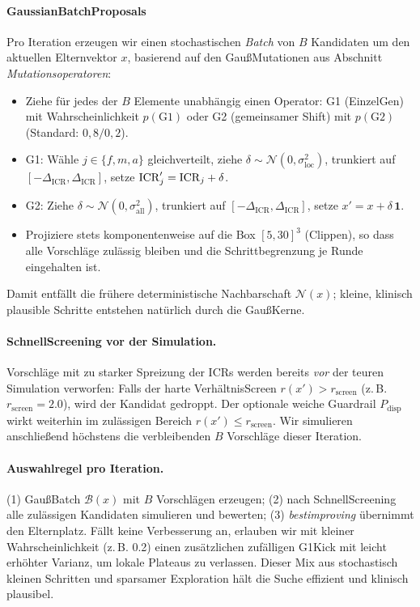 \paragraph{Gaussian\-Batch\-Proposals}
Pro Iteration erzeugen wir einen stochastischen \emph{Batch} von $B$ Kandidaten um den aktuellen Elternvektor $x$, basierend auf den Gau{\ss}\-Mutationen aus Abschnitt \emph{Mutationsoperatoren}:
\begin{itemize}
  \item Ziehe f\"ur jedes der $B$ Elemente unabh\"angig einen Operator: G1 (Einzel\-Gen) mit Wahrscheinlichkeit $p(\mathrm{G1})$ oder G2 (gemeinsamer Shift) mit $p(\mathrm{G2})$ (Standard: $0{,}8/0{,}2$).
  \item G1: W\"ahle $j\in\{f,m,a\}$ gleichverteilt, ziehe $\delta\sim\mathcal N(0,\sigma_{\text{loc}}^2)$, trunkiert auf $[-\Delta_{\mathrm{ICR}},\Delta_{\mathrm{ICR}}]$, setze $\mathrm{ICR}'_j=\mathrm{ICR}_j+\delta$.
  \item G2: Ziehe $\delta\sim\mathcal N(0,\sigma_{\text{all}}^2)$, trunkiert auf $[-\Delta_{\mathrm{ICR}},\Delta_{\mathrm{ICR}}]$, setze $x'=x+\delta\,\mathbf 1$.
  \item Projiziere stets komponentenweise auf die Box $[5,30]^3$ (Clippen), so dass alle Vorschl\"age zul\"assig bleiben und die Schrittbegrenzung je Runde eingehalten ist.
\end{itemize}
Damit entf\"allt die fr\"uhere deterministische Nachbarschaft $\mathcal N(x)$; kleine, klinisch plausible Schritte entstehen nat\"urlich durch die Gau{\ss}\-Kerne.

\paragraph{Schnell\-Screening vor der Simulation.}
Vorschl\"age mit zu starker Spreizung der ICRs werden bereits \emph{vor} der teuren Simulation verworfen: Falls der harte Verh\"altnis\-Screen $r(x')>r_{\text{screen}}$ (z.\,B. $r_{\text{screen}}=2.0$), wird der Kandidat gedroppt. Der optionale weiche Guardrail $P_{\mathrm{disp}}$ wirkt weiterhin im zul\"assigen Bereich $r(x')\le r_{\text{screen}}$. Wir simulieren anschlie\ss end h\"ochstens die verbleibenden $B$ Vorschl\"age dieser Iteration.

\paragraph{Auswahlregel pro Iteration.}
(1) Gau{\ss}\-Batch $\mathcal B(x)$ mit $B$ Vorschl\"agen erzeugen; (2) nach Schnell\-Screening alle zul\"assigen Kandidaten simulieren und bewerten; (3) \emph{best\-improving} \"ubernimmt den Elternplatz. F\"allt keine Verbesserung an, erlauben wir mit kleiner Wahrscheinlichkeit (z.\,B. 0.2) einen zus\"atzlichen zuf\"alligen G1\-Kick mit leicht erh\"ohter Varianz, um lokale Plateaus zu verlassen. Dieser Mix aus stochastisch kleinen Schritten und sparsamer Exploration h\"alt die Suche effizient und klinisch plausibel.